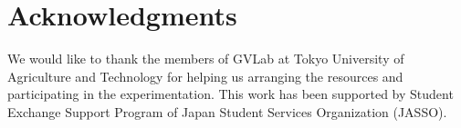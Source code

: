 \documentclass{llncs}
\begin{document}
\section{Acknowledgments}
		We would like to thank the members of GVLab at Tokyo University of Agriculture and Technology for helping us arranging the resources and participating in the experimentation. This work has been supported by Student Exchange Support Program of Japan Student Services Organization (JASSO).


\end{document}
